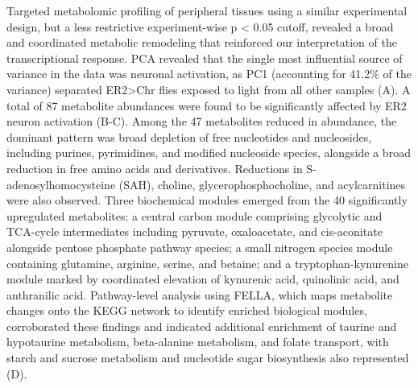 Targeted metabolomic profiling of peripheral tissues using a similar experimental design, but a less restrictive experiment-wise p < 0.05 cutoff, revealed a broad and coordinated metabolic remodeling that reinforced our interpretation of the transcriptional response. 
PCA revealed that the single most influential source of variance in the data was neuronal activation, as PC1 (accounting for 41.2\% of the variance) separated ER2>Chr flies exposed to light from all other samples (A). 
A total of 87 metabolite abundances were found to be significantly affected by ER2 neuron activation (B-C). 
Among the 47 metabolites reduced in abundance, the dominant pattern was broad depletion of free nucleotides and nucleosides, including purines, pyrimidines, and modified nucleoside species, alongside a broad reduction in free amino acids and derivatives. 
Reductions in S-adenosylhomocysteine (SAH), choline, glycerophosphocholine, and acylcarnitines were also observed. 
Three biochemical modules emerged from the 40 significantly upregulated metabolites: a central carbon module comprising glycolytic and TCA-cycle intermediates including pyruvate, oxaloacetate, and cis-aconitate alongside pentose phosphate pathway species; a small nitrogen species module containing glutamine, arginine, serine, and betaine; and a tryptophan-kynurenine module marked by coordinated elevation of kynurenic acid, quinolinic acid, and anthranilic acid. 
Pathway-level analysis using FELLA, which maps metabolite changes onto the KEGG network to identify enriched biological modules, corroborated these findings and indicated additional enrichment of taurine and hypotaurine metabolism, beta-alanine metabolism, and folate transport, with starch and sucrose metabolism and nucleotide sugar biosynthesis also represented (D).
